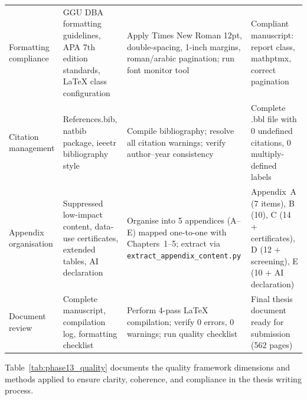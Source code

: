 \begin{xltabular}{\textwidth}{@{} >{\raggedright\arraybackslash}p{0.16\textwidth} X X X @{}}
\addlinespace
Formatting compliance        & GGU DBA formatting guidelines, APA 7th edition standards, \LaTeX{} class configuration                                                       & Apply Times New Roman 12pt, double-spacing, 1-inch margins, roman/arabic pagination; run font monitor tool                                & Compliant manuscript: report class, mathptmx, correct pagination \\
\addlinespace
Citation management          & References.bib, natbib package, ieeetr bibliography style                                                                                    & Compile bibliography; resolve all citation warnings; verify author--year consistency                                                       & Complete .bbl file with 0 undefined citations, 0 multiply-defined labels \\
\addlinespace
Appendix organisation        & Suppressed low-impact content, data-use certificates, extended tables, AI declaration                                                         & Organise into 5 appendices (A--E) mapped one-to-one with Chapters~1--5; extract via \texttt{extract\_appendix\_\allowbreak content.py}                & Appendix~A (7 items), B (10), C (14 + certificates), D (12 + screening), E (10 + AI declaration) \\
\addlinespace
Document review              & Complete manuscript, compilation log, formatting checklist                                                                                    & Perform 4-pass \LaTeX{} compilation; verify 0 errors, 0 warnings; run quality checklist                                                  & Final thesis document ready for submission (562 pages) \\
\end{xltabular}
\endgroup

\vspace{1.5em}

Table~\ref{tab:phase13_quality} documents the quality framework dimensions and methods applied to ensure clarity, coherence, and compliance in the thesis writing process.

